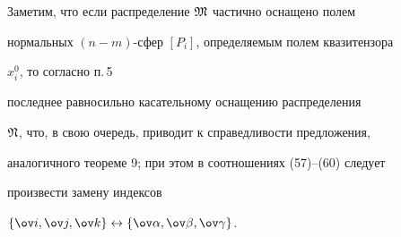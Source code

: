  


Заметим, что если распределение $\frak M$ частично оснащено полем 


нормальных $(n-m)$-сфер $[P_i]$, определяемым полем квазитензора 


$x^0_i$, то согласно п.\,5 


последнее равносильно касательному оснащению распределения 


$\frak N$, что, в свою очередь, приводит к справедливости предложения, 


аналогичного теореме 9; при этом в соотношениях (57)--(60) следует 


произвести замену индексов 


$\{\ov i,\ov j,\ov k\}\leftrightarrow\{\ov\alpha,\ov\beta,\ov\gamma\}$. 


 


